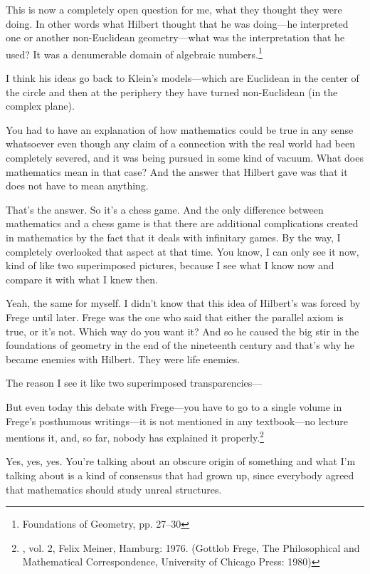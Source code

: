 This is now a completely open question for me, what they thought 
they were doing. In other words what Hilbert thought that he was 
doing---he interpreted one or another non-Euclidean geometry---what 
was the interpretation that he used? It was a denumerable domain of 
algebraic numbers.\footnote{Foundations of Geometry, pp. 27--30}

 I think his ideas go back to Klein's models---which are 
Euclidean in the center of the circle and then at the periphery they have 
turned non-Euclidean (in the complex plane). 

 You had to have an explanation of how mathematics could be 
true in any sense whatsoever even though any claim of a connection 
with the real world had been completely severed, and it was being 
pursued in some kind of vacuum. What does mathematics mean in that 
case? And the answer that Hilbert gave was that it does not have to 
mean anything. 

That's the answer. So it's a chess game. And the only difference 
between mathematics and a chess game is that there are additional 
complications created in mathematics by the fact that it deals with 
infinitary games. By the way, I completely overlooked that aspect at 
that time. You know, I can only see it now, kind of like two superimposed 
pictures, because I see what I know now and compare it with what I knew then. 

 Yeah, the same for myself. I didn't know that this idea of 
Hilbert's was forced by Frege until later. Frege was the one who said 
that either the parallel axiom is true, or it's not. Which way do you want 
it? And so he caused the big stir in the foundations of geometry in the 
end of the nineteenth century and that's why he became enemies with 
Hilbert. They were life enemies. 

 The reason I see it like two superimposed transparencies--- 

 But even today this debate with Frege---you have to go to a 
single volume in Frege's posthumous writings---it is not mentioned in 
any textbook---no lecture mentions it, and, so far, nobody has 
explained it properly.\footnote{, vol. 2, Felix Meiner, Hamburg: 1976. (Gottlob Frege, The Philosophical and Mathematical Correspondence, University of Chicago Press: 1980)}

 Yes, yes, yes. You're talking about an obscure origin of something 
and what I'm talking about is a kind of consensus that had grown 
up, since everybody agreed that mathematics should study unreal structures. 

